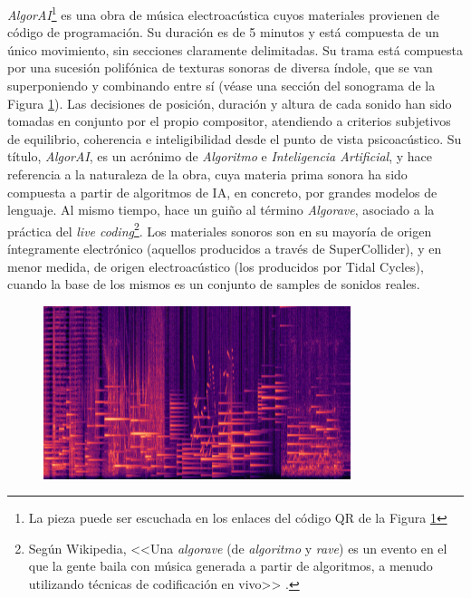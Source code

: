 \emph{AlgorAI}\footnote{La pieza puede ser escuchada en los enlaces del código QR de la Figura \ref{fig:sonograma_algorai}} es una obra de música electroacústica cuyos materiales provienen de código de programación. Su duración es de 5 minutos y está compuesta de un único movimiento, sin secciones claramente delimitadas. Su trama está compuesta por una sucesión polifónica de texturas sonoras de diversa índole, que se van superponiendo y combinando entre sí (véase una sección del sonograma de la Figura \ref{fig:sonograma_algorai}). Las decisiones de posición, duración y altura de cada sonido han sido tomadas en conjunto por el propio compositor, atendiendo a criterios subjetivos de equilibrio, coherencia e inteligibilidad desde el punto de vista psicoacústico. Su título, \emph{AlgorAI}, es un acrónimo de \emph{Algoritmo} e \emph{Inteligencia Artificial}, y hace referencia a la naturaleza de la obra, cuya materia prima sonora ha sido compuesta a partir de algoritmos de IA, en concreto, por grandes modelos de lenguaje. Al mismo tiempo, hace un guiño al término \emph{Algorave}, asociado a la práctica del \emph{live coding}\footnote{Según Wikipedia, <<Una \emph{algorave} (de \emph{algoritmo} y \emph{rave}) es un evento en el que la gente baila con música generada a partir de algoritmos, a menudo utilizando técnicas de codificación en vivo>> \citep{Algorave2023}.}.  Los materiales sonoros son en su mayoría de origen íntegramente electrónico (aquellos producidos a través de SuperCollider), y en menor medida, de origen electroacústico (los producidos por Tidal Cycles), cuando la base de los mismos es un conjunto de {samples} de sonidos reales.

\begin{figure}[H]
    \centering
    \includegraphics[width=0.8\textwidth]{./figuras/sonograma_02.png}
    \source{\propio}
    \label{fig:sonograma_algorai}
\end{figure}

